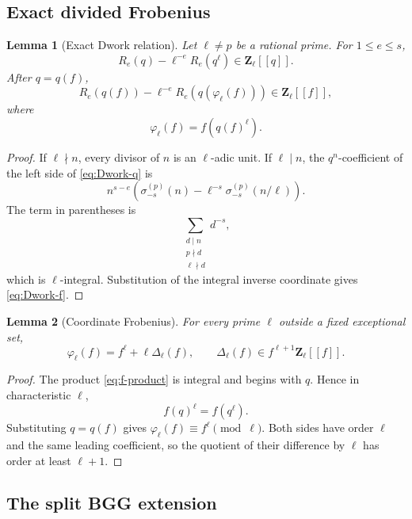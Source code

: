 \documentclass[11pt]{article}
\newtheorem{lemma}[lemma]{Lemma}
\theoremstyle{definition}
\theoremstyle{remark}
\newcommand{\Z}{\mathbf Z}
\begin{document}
\subsection{Exact divided Frobenius}

\begin{lemma}[Exact Dwork relation]\label{lem:Dwork}
Let $\ell\ne p$ be a rational prime.  For $1\le e\le s$,
\begin{equation}\label{eq:Dwork-q}
 \boxed{R_e(q)-\ell^{-e}R_e(q^\ell)\in\Z_\ell[[q]].}
\end{equation}
After $q=q(f)$,
\begin{equation}\label{eq:Dwork-f}
 R_e(q(f))-\ell^{-e}R_e(q(\varphi_\ell(f)))
 \in\Z_\ell[[f]],
\end{equation}
where
\[
 \varphi_\ell(f)=f(q(f)^\ell).
\]
\end{lemma}

\begin{proof}
If $\ell\nmid n$, every divisor of $n$ is an $\ell$-adic unit.  If
$\ell\mid n$, the $q^n$-coefficient of the left side of
\eqref{eq:Dwork-q} is
\[
 n^{s-e}\left(
 \sigma_{-s}^{(p)}(n)-\ell^{-s}\sigma_{-s}^{(p)}(n/\ell)
 \right).
\]
The term in parentheses is
\[
 \sum_{\substack{d\mid n\\p\nmid d\\\ell\nmid d}}d^{-s},
\]
which is $\ell$-integral.  Substitution of the integral inverse coordinate
gives \eqref{eq:Dwork-f}.
\end{proof}

\begin{lemma}[Coordinate Frobenius]\label{lem:coordinate-Frob}
For every prime $\ell$ outside a fixed exceptional set,
\begin{equation}\label{eq:Frob-expansion}
 \boxed{
 \varphi_\ell(f)=f^\ell+\ell\Delta_\ell(f),
 \qquad
 \Delta_\ell(f)\in f^{\ell+1}\Z_\ell[[f]].}
\end{equation}
\end{lemma}

\begin{proof}
The product \eqref{eq:f-product} is integral and begins with $q$.  Hence
in characteristic $\ell$,
\[
 f(q)^\ell=f(q^\ell).
\]
Substituting $q=q(f)$ gives
$\varphi_\ell(f)\equiv f^\ell\pmod\ell$.  Both sides have order
$\ell$ and the same leading coefficient, so the quotient of their difference
by $\ell$ has order at least $\ell+1$.
\end{proof}

\subsection{The split BGG extension}
\end{document}

